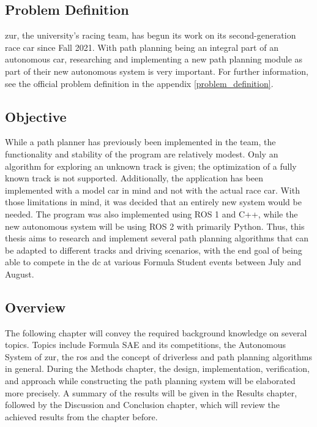 \subsection{Problem Definition} \label{sec:Problem Definition}
\acrlong{zur}, the university's racing team, has begun its work on its second-generation race car since Fall 2021. With path planning being an integral part of an autonomous car, researching and implementing a new path planning module as part of their new autonomous system is very important. For further information, see the official problem definition in the appendix \ref{problem_definition}.

\subsection{Objective} \label{sec:Objective}
While a path planner has previously been implemented in the team, the functionality and stability of the program are relatively modest. Only an algorithm for exploring an unknown track is given; the optimization of a fully known track is not supported. Additionally, the application has been implemented with a model car in mind and not with the actual race car. With those limitations in mind, it was decided that an entirely new system would be needed. The program was also implemented using ROS 1 and C++, while the new autonomous system will be using ROS 2 with primarily Python. Thus, this thesis aims to research and implement several path planning algorithms that can be adapted to different tracks and driving scenarios, with the end goal of being able to compete in the \acrlong{dc} at various Formula Student events between July and August.

\subsection{Overview} \label{sec:Overview}
The following chapter will convey the required background knowledge on several topics. Topics include Formula SAE and its competitions, the Autonomous System of \acrlong{zur}, the \acrlong{ros} and the concept of driverless and path planning algorithms in general. During the Methods chapter, the design, implementation, verification, and approach while constructing the path planning system will be elaborated more precisely. A summary of the results will be given in the Results chapter, followed by the Discussion and Conclusion chapter, which will review the achieved results from the chapter before.
